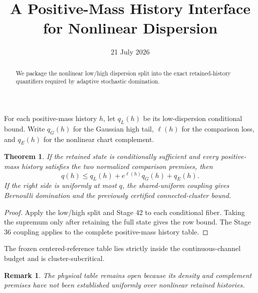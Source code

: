 \documentclass[11pt]{article}\usepackage[margin=1in]{geometry}\usepackage{amsmath,amsthm}\newtheorem{theorem}{Theorem}\newtheorem{remark}{Remark}
\title{A Positive-Mass History Interface for Nonlinear Dispersion}\author{}\date{21 July 2026}
\begin{document}
\maketitle
\begin{abstract}We package the nonlinear low/high dispersion split into the exact retained-history quantifiers required by adaptive stochastic domination.\end{abstract}
For each positive-mass history $h$, let $q_L(h)$ be its low-dispersion
conditional bound.  Write $q_G(h)$ for the Gaussian high tail, $\ell(h)$ for
the comparison loss, and $q_E(h)$ for the nonlinear chart complement.
\begin{theorem}If the retained state is conditionally sufficient and every positive-mass history satisfies the two normalized comparison premises, then
\[q(h)\le q_L(h)+e^{\ell(h)}q_G(h)+q_E(h).
\]
If the right side is uniformly at most $q$, the shared-uniform coupling gives Bernoulli domination and the previously certified connected-cluster bound.\end{theorem}
\begin{proof}Apply the low/high split and Stage 42 to each conditional fiber. Taking the supremum only after retaining the full state gives the row bound. The Stage 36 coupling applies to the complete positive-mass history table.\end{proof}
The frozen centered-reference table lies strictly inside the continuous-channel budget and is cluster-subcritical.
\begin{remark}The physical table remains open because its density and complement premises have not been established uniformly over nonlinear retained histories.\end{remark}
\end{document}
